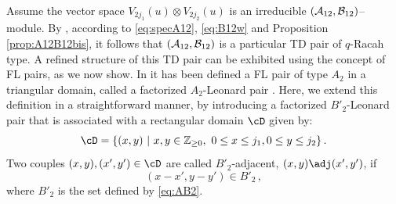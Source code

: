 \documentclass[11pt]{amsart}
\numberwithin{equation}{section}
\numberwithin{equation}{section}
\begin{document}
Assume the vector space $V_{2j_1}(u)\otimes V_{2j_2}(u)$ is an irreducible $({\cal A}_{12},{\cal B}_{12})$--module. By \cite[Thm.\,3.7]{Ter03}, according to
\eqref{eq:specA12}, \eqref{eq:B12w} and Proposition \ref{prop:A12B12bis}, it follows that  $({\cal A}_{12},{\cal B}_{12})$ is a particular TD pair of $q$-Racah type. A refined structure of this TD pair can be exhibited using the concept of  FL pairs, as we now show. In \cite{CZ23} it has been defined a FL pair of type $A_2$ in a triangular domain, called a factorized $A_2$-Leonard pair \cite[Def 3.3]{CZ23}.  Here, we extend this definition in a straightforward manner, by introducing a factorized $B'_2$-Leonard pair that is associated with a rectangular domain  
$\cD$ given by:
\begin{equation}\label{eq:dom}
 \cD=\{ (x,y)\ | \ x,y\in \mathbb{Z}_{\geq 0}, \ 0\leq x\leq j_1, 0\leq y\leq j_2 \}\,.
\end{equation}
Two couples $(x,y),(x',y')\in \cD$ are called $B'_2$-adjacent, $(x,y)\adj(x',y')$, if
\begin{equation}
  (x-x',y-y') \in B'_2\,,
\end{equation}
where $B'_2$ is the set defined by \eqref{eq:AB2}.
\end{document}
